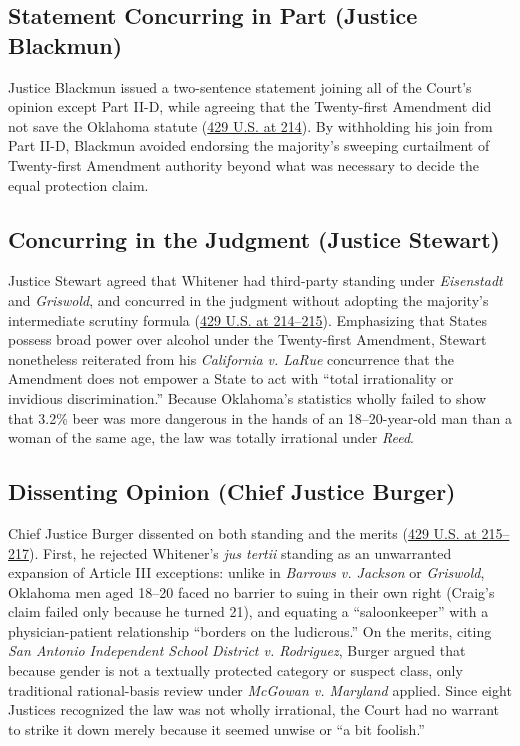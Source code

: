 \documentclass[12pt]{article}
\begin{document}
\subsection{Statement Concurring in Part (Justice Blackmun)}

Justice Blackmun issued a two-sentence statement joining all of the Court's opinion except Part II-D, while agreeing that the Twenty-first Amendment did not save the Oklahoma statute (\href{https://supreme.justia.com/cases/federal/us/429/190/}{429 U.S. at 214}). By withholding his join from Part II-D, Blackmun avoided endorsing the majority's sweeping curtailment of Twenty-first Amendment authority beyond what was necessary to decide the equal protection claim.

\subsection{Concurring in the Judgment (Justice Stewart)}

Justice Stewart agreed that Whitener had third-party standing under \textit{Eisenstadt} and \textit{Griswold}, and concurred in the judgment without adopting the majority's intermediate scrutiny formula (\href{https://supreme.justia.com/cases/federal/us/429/190/}{429 U.S. at 214--215}). Emphasizing that States possess broad power over alcohol under the Twenty-first Amendment, Stewart nonetheless reiterated from his \textit{California v. LaRue} concurrence that the Amendment does not empower a State to act with ``total irrationality or invidious discrimination.'' Because Oklahoma's statistics wholly failed to show that 3.2\% beer was more dangerous in the hands of an 18--20-year-old man than a woman of the same age, the law was totally irrational under \textit{Reed}.

\subsection{Dissenting Opinion (Chief Justice Burger)}

Chief Justice Burger dissented on both standing and the merits (\href{https://supreme.justia.com/cases/federal/us/429/190/}{429 U.S. at 215--217}). First, he rejected Whitener's \textit{jus tertii} standing as an unwarranted expansion of Article III exceptions: unlike in \textit{Barrows v. Jackson} or \textit{Griswold}, Oklahoma men aged 18--20 faced no barrier to suing in their own right (Craig's claim failed only because he turned 21), and equating a ``saloonkeeper'' with a physician-patient relationship ``borders on the ludicrous.'' On the merits, citing \textit{San Antonio Independent School District v. Rodriguez}, Burger argued that because gender is not a textually protected category or suspect class, only traditional rational-basis review under \textit{McGowan v. Maryland} applied. Since eight Justices recognized the law was not wholly irrational, the Court had no warrant to strike it down merely because it seemed unwise or ``a bit foolish.''
\end{document}
